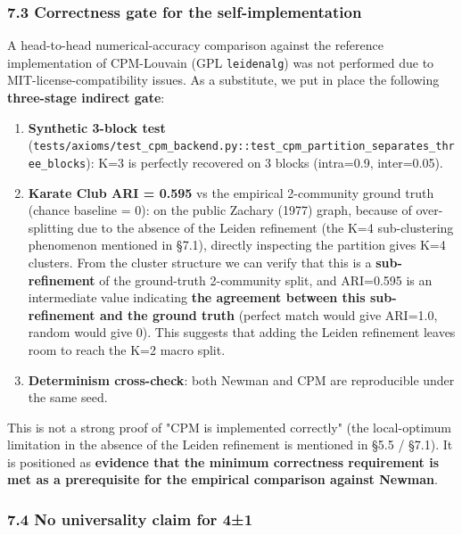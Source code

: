 \documentclass[
]{article}
\providecommand{\tightlist}{%
  \setlength{\itemsep}{0pt}\setlength{\parskip}{0pt}}
\begin{document}
\subsubsection{7.3 Correctness gate for the
self-implementation}\label{73-correctness-gate-for-the-self-implementation}

A head-to-head numerical-accuracy comparison against the reference
implementation of CPM-Louvain (GPL \texttt{leidenalg}) was not performed
due to MIT-license-compatibility issues. As a substitute, we put in
place the following \textbf{three-stage indirect gate}:

\begin{enumerate}
\def\labelenumi{\arabic{enumi}.}
\tightlist
\item
  \textbf{Synthetic 3-block test}
  (\texttt{tests/axioms/test\_cpm\_backend.py::test\_cpm\_partition\_separates\_three\_blocks}):
  K=3 is perfectly recovered on 3 blocks (intra=0.9, inter=0.05).
\item
  \textbf{Karate Club ARI = 0.595} vs the empirical 2-community ground
  truth (chance baseline = 0): on the public Zachary (1977) graph,
  because of over-splitting due to the absence of the Leiden refinement
  (the K=4 sub-clustering phenomenon mentioned in §7.1), directly
  inspecting the partition gives K=4 clusters. From the cluster
  structure we can verify that this is a \textbf{sub-refinement} of the
  ground-truth 2-community split, and ARI=0.595 is an intermediate value
  indicating \textbf{the agreement between this sub-refinement and the
  ground truth} (perfect match would give ARI=1.0, random would give 0).
  This suggests that adding the Leiden refinement leaves room to reach
  the K=2 macro split.
\item
  \textbf{Determinism cross-check}: both Newman and CPM are reproducible
  under the same seed.
\end{enumerate}

This is not a strong proof of "CPM is implemented correctly" (the
local-optimum limitation in the absence of the Leiden refinement is
mentioned in §5.5 / §7.1). It is positioned as \textbf{evidence that the
minimum correctness requirement is met as a prerequisite for the
empirical comparison against Newman}.

\subsubsection{7.4 No universality claim for
4±1}\label{74-no-universality-claim-for-41}
\end{document}
